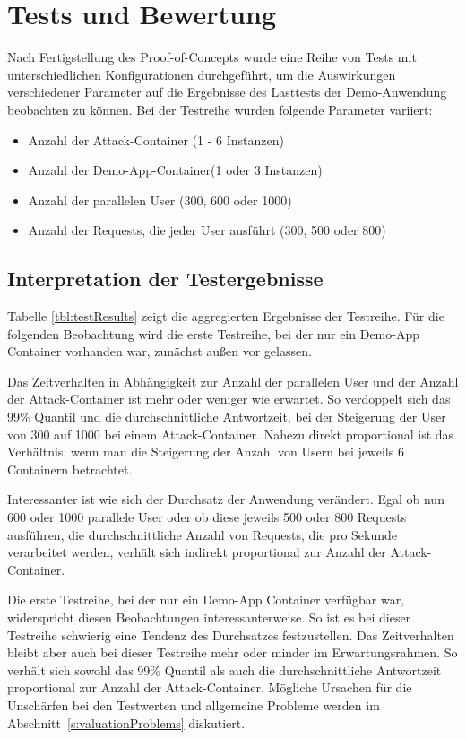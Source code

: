 \chapter{Tests und Bewertung}

Nach Fertigstellung des Proof-of-Concepts wurde eine Reihe von Tests mit unterschiedlichen Konfigurationen durchgef\"uhrt, um die Auswirkungen verschiedener Parameter auf die Ergebnisse des Lasttests der Demo-Anwendung beobachten zu k\"onnen.
Bei der Testreihe wurden folgende Parameter variiert:

\begin{itemize}
	\item Anzahl der Attack-Container (1 - 6 Instanzen)
	\item Anzahl der Demo-App-Container(1 oder 3 Instanzen)
	\item Anzahl der parallelen User (300, 600 oder 1000)
	\item Anzahl der Requests, die jeder User ausf\"uhrt (300, 500 oder 800)
\end{itemize}

\section{Interpretation der Testergebnisse}
\label{s:valuationInterpretation}

Tabelle \ref{tbl:testResults} zeigt die aggregierten Ergebnisse der Testreihe.
F\"ur die folgenden Beobachtung wird die erste Testreihe, bei der nur ein Demo-App Container vorhanden war, zun\"achst au\ss{}en vor gelassen.

Das Zeitverhalten in Abh\"angigkeit zur Anzahl der parallelen User und der Anzahl der Attack-Container ist mehr oder weniger wie erwartet.
So verdoppelt sich das 99\% Quantil und die durchschnittliche Antwortzeit, bei der Steigerung der User von 300 auf 1000 bei einem Attack-Container.
Nahezu direkt proportional ist das Verh\"altnis, wenn man die Steigerung der Anzahl von Usern bei jeweils 6 Containern betrachtet.

Interessanter ist wie sich der Durchsatz der Anwendung ver\"andert.
Egal ob nun 600 oder 1000 parallele User oder ob diese jeweils 500 oder 800 Requests ausf\"uhren, die durchschnittliche Anzahl von Requests, die pro Sekunde verarbeitet werden, verh\"alt sich indirekt proportional zur Anzahl der Attack-Container.

Die erste Testreihe, bei der nur ein Demo-App Container verf\"ugbar war, widerspricht diesen Beobachtungen interessanterweise.
So ist es bei dieser Testreihe schwierig eine Tendenz des Durchsatzes festzustellen.
Das Zeitverhalten bleibt aber auch bei dieser Testreihe mehr oder minder im Erwartungsrahmen.
So verh\"alt sich sowohl das 99\% Quantil als auch die durchschnittliche Antwortzeit proportional zur Anzahl der Attack-Container.
M\"ogliche Ursachen f\"ur die Unsch\"arfen bei den Testwerten und allgemeine Probleme werden im Abschnitt~\ref{s:valuationProblems} diskutiert.

